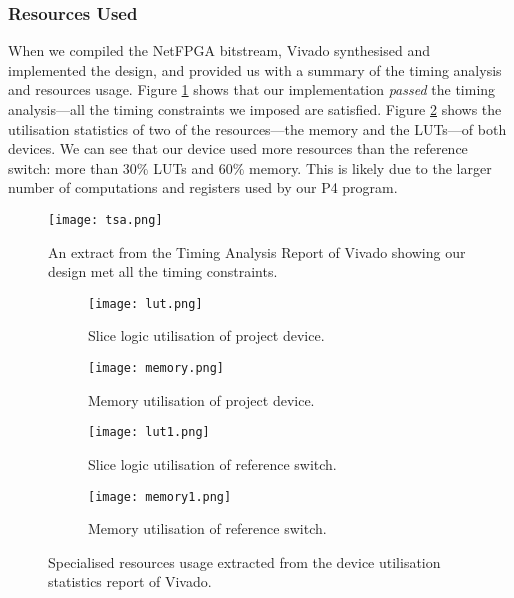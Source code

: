 \subsubsection{Resources Used}
When we compiled the NetFPGA bitstream, Vivado synthesised and implemented the design, and provided us with a summary of the timing analysis and resources usage. Figure \ref{fig:tsa} shows that our implementation \textit{passed} the timing analysis---all the timing constraints we imposed are satisfied. Figure \ref{fig:memory} shows the utilisation statistics of two of the resources---the memory and the LUTs---of both devices. We can see that our device used more resources than the reference switch: more than $30\%$ LUTs and $60\%$ memory. This is likely due to the larger number of computations and registers used by our P4 program. 

\begin{figure}[!h]
	\centering
	\texttt{[image: tsa.png]}
	\caption{An extract from the Timing Analysis Report of Vivado showing our design met all the timing constraints.}
	\label{fig:tsa}
\end{figure}

\begin{figure}[h]
	\centering
	\begin{subfigure}[b]{0.45\textwidth}
		\centering
		\texttt{[image: lut.png]}
		\caption{Slice logic utilisation of project device.}
	\end{subfigure}
	\hfill
	\begin{subfigure}[b]{0.45\textwidth}
		\centering
		\texttt{[image: memory.png]}
		\caption{Memory utilisation of project device.}
	\end{subfigure}
	\begin{subfigure}[b]{0.45\textwidth}
		\centering
		\texttt{[image: lut1.png]}
		\caption{Slice logic utilisation of reference switch.}
	\end{subfigure}
	\hfill
	\begin{subfigure}[b]{0.45\textwidth}
		\centering
		\texttt{[image: memory1.png]}
		\caption{Memory utilisation of reference switch.}
	\end{subfigure}
	\caption{Specialised resources usage extracted from the device utilisation statistics report of Vivado.}
	\label{fig:memory}
\end{figure}

